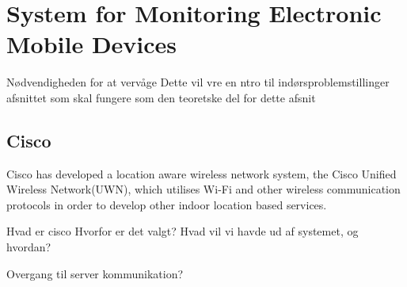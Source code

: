 \section{System for Monitoring Electronic Mobile Devices} %
Nødvendigheden for at vervåge
	Dette vil vre en ntro til indørsproblemstillinger afsnittet som skal fungere som den teoretske del for dette afsnit

\subsection{Cisco}
Cisco has developed a location aware wireless network system, the Cisco Unified Wireless Network(UWN), which utilises Wi-Fi and other wireless communication protocols in order to develop other indoor location based services\cite{uwn}.

Hvad er cisco
Hvorfor er det valgt?
Hvad vil vi havde ud af systemet, og hvordan?

Overgang til server kommunikation?